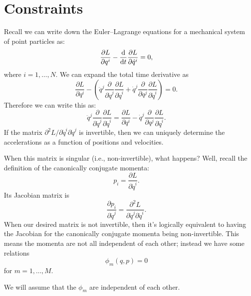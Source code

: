 \section{Constraints}

\M
Recall we can write down the Euler--Lagrange equations for a mechanical
system of point particles as:
\begin{equation}
\frac{\partial L}{\partial q^{i}} - \frac{\mathrm{d}}{\mathrm{d} t}\frac{\partial L}{\partial\dot{q}^{i}}=0,
\end{equation}
where $i=1,\dots,N$.
We can expand the total time derivative as
\begin{equation}
\frac{\partial L}{\partial q^{i}}
- \left(\ddot{q}^{j}\frac{\partial}{\partial\dot{q}^{j}}\frac{\partial L}{\partial\dot{q}^{i}}
+\dot{q}^{j}\frac{\partial}{\partial q^{j}}\frac{\partial L}{\partial\dot{q}^{i}}\right)=0.
\end{equation}
Therefore we can write this as:
\begin{equation}
\ddot{q}^{j}\frac{\partial}{\partial\dot{q}^{j}}\frac{\partial L}{\partial\dot{q}^{i}}
=\frac{\partial L}{\partial q^{i}}
-\dot{q}^{j}\frac{\partial}{\partial q^{j}}\frac{\partial L}{\partial\dot{q}^{i}}.
\end{equation}
If the matrix $\partial^{2}L/\partial\dot{q}^{i}\partial\dot{q}^{j}$ is
invertible, then we can uniquely determine the accelerations as a
function of positions and velocities.

\M When this matrix is singular
(i.e., non-invertible), what happens? Well, recall the definition of the
canonically conjugate momenta:
\begin{equation}
p_{i} = \frac{\partial L}{\partial\dot{q}^{i}}.
\end{equation}
Its Jacobian matrix is
\begin{equation}
\frac{\partial p_{i}}{\partial\dot{q}^{j}} = \frac{\partial^{2} L}{\partial\dot{q}^{j}\partial\dot{q}^{i}}.
\end{equation}
When our desired matrix is not invertible, then it's logically
equivalent to having the Jacobian for the canonically conjugate momenta
being non-invertible. This means the momenta are not all independent of
each other; instead we have some relations
\begin{equation}
\phi_{m}(q,p)=0
\end{equation}
for $m=1,\dots,M$.

\begin{remark}
We will assume that the $\phi_{m}$ are independent of each other.
\end{remark}

